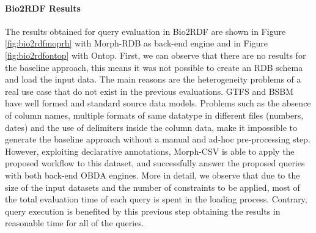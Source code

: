 \noindent\paragraph*{\textbf{Bio2RDF Results}}
The results obtained for query evaluation in Bio2RDF are shown in Figure \ref{fig:bio2rdfmoprh} with Morph-RDB as back-end engine and in Figure \ref{fig:bio2rdfontop} with Ontop. First, we can observe that there are no results for the baseline approach, this means it was not possible to create an RDB schema and load the input data. The main reasons are the heterogeneity problems of a real use case that do not exist in the previous evaluations. GTFS and BSBM have well formed and standard source data models. Problems such as the absence of column names, multiple formats of same datatype in different files (numbers, dates) and the use of delimiters inside the column data, make it impossible to generate the baseline approach without a manual and ad-hoc pre-processing step. However, exploiting declarative annotations, Morph-CSV is able to apply the proposed workflow to this dataset, and successfully answer the proposed queries with both back-end OBDA engines. More in detail, we observe that due to the size of the input datasets and the number of constraints to be applied, most of the total evaluation time of each query is spent in the loading process. Contrary, query execution is benefited by this previous step obtaining the results in reasonable time for all of the queries. 




